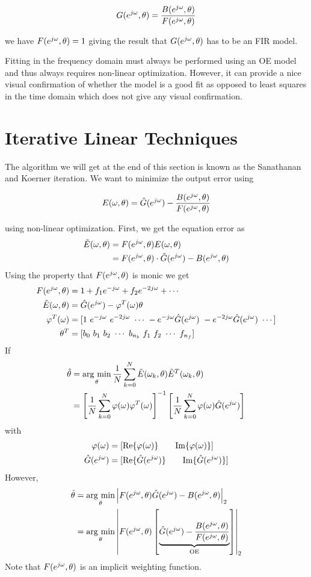 \begin{equation*}
G(e^{j\omega},\theta) = \frac{B(e^{j\omega},\theta)}{F(e^{j\omega},\theta)}
\end{equation*}

we have $F(e^{j\omega},\theta) = 1$ giving the result that $G(e^{j\omega},\theta)$ has to be an FIR model.

Fitting in the frequency domain must always be performed using an OE model and thus always requires non-linear optimization.
However, it can provide a nice visual confirmation of whether the model is a good fit as opposed to least squares in the time domain which does not give any visual confirmation.

\section{Iterative Linear Techniques}
The algorithm we will get at the end of this section is known as the Sanathanan and Koerner iteration.
We want to minimize the output error using

\begin{equation*}
E(\omega,\theta) = \hat{G}(e^{j\omega}) - \frac{B(e^{j\omega},\theta)}{F(e^{j\omega},\theta)}
\end{equation*}

using non-linear optimization.
First, we get the equation error as
\begin{align*}
\tilde{E}(\omega,\theta) &= F(e^{j\omega},\theta)E(\omega,\theta) \\
&= F(e^{j\omega},\theta)\cdot\tilde{G}(e^{j\omega}) - B(e^{j\omega},\theta)
\end{align*}
Using the property that $F(e^{j\omega},\theta)$ is monic we get
\begin{align*}
F(e^{j\omega},\theta) &= 1 + f_1e^{-j\omega} + f_2e^{-2j\omega} + \cdots \\
\tilde{E}(\omega,\theta) &= \hat{G}(e^{j\omega}) - \varphi^T(\omega)\theta \\
\varphi^T(\omega) &= [1~e^{-j\omega}~e^{-2j\omega}~\cdots~-e^{-j\omega}\hat{G}(e^{j\omega})~-e^{-2j\omega}\hat{G}(e^{j\omega})~\cdots] \\
\theta^T &= [b_0~b_1~b_2~\cdots~b_{n_b}~f_1~f_2~\cdots~f_{n_f}]
\end{align*}
If
\begin{align*}
\hat{\theta} &= \mathop{\arg\,\min}\limits_\theta \frac{1}{N}\sum_{k=0}^N\tilde{E}(\omega_k,\theta)\tilde{E}^T(\omega_k,\theta) \\
&= {\left[\frac{1}{N}\sum_{k=0}^N\varphi(\omega)\varphi^T(\omega)\right]}^{-1}\left[\frac{1}{N}\sum_{k=0}^N\varphi(\omega)\hat{G}(e^{j\omega})\right]
\end{align*}
with
\begin{align*}
\varphi(\omega) &= [\text{Re}\{\varphi(\omega)\} \qquad \text{Im}\{\varphi(\omega)\}] \\
\hat{G}(e^{j\omega}) &= [\text{Re}\{\hat{G}(e^{j\omega})\} \qquad \text{Im}\{\hat{G}(e^{j\omega})\}]
\end{align*}
However,
\begin{align*}
\hat{\theta} &= \mathop{\arg\,\min}\limits_\theta \left|F(e^{j\omega},\theta)\hat{G}(e^{j\omega}) - B(e^{j\omega},\theta)\right|_2 \\
&= \mathop{\arg\,\min}\limits_\theta \left|F(e^{j\omega},\theta)\left[\underbrace{\hat{G}(e^{j\omega}) - \frac{B(e^{j\omega},\theta)}{F(e^{j\omega},\theta)}}_{\text{OE}}\right]\right|_2
\end{align*}
Note that $F(e^{j\omega},\theta)$ is an implicit weighting function.

